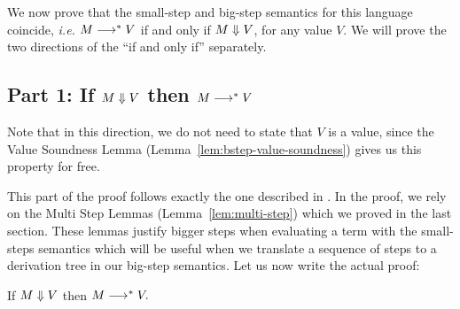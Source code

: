 We now prove that the small-step and big-step semantics for this language
coincide, {\em i.e.} $M \longrightarrow^* V$ if and only if $M \Downarrow V$, for any value
 $V$. We will prove the two directions of the ``if and only if'' separately.

\subsection{Part 1: If $M \Downarrow V$ then $M \longrightarrow^* V$}

Note that in this direction, we do not need to state that $V$ is a value, since
the Value Soundness Lemma (Lemma~\ref{lem:bstep-value-soundness}) gives us this
property for free.

This part of the proof follows exactly the one described in \cite{TAPL}. In the
proof, we rely on the Multi Step Lemmas (Lemma~\ref{lem:multi-step}) which we
proved in the last section. These lemmas justify bigger steps when evaluating a
term with the small-steps semantics which will be useful when we translate a
sequence of steps to a derivation tree in our big-step semantics. Let us now
write the actual proof:

\begin{proposition}
  \label{prop:bstep-to-mstep}
  If $M \Downarrow V$ then $M \longrightarrow^* V.$
\end{proposition}

